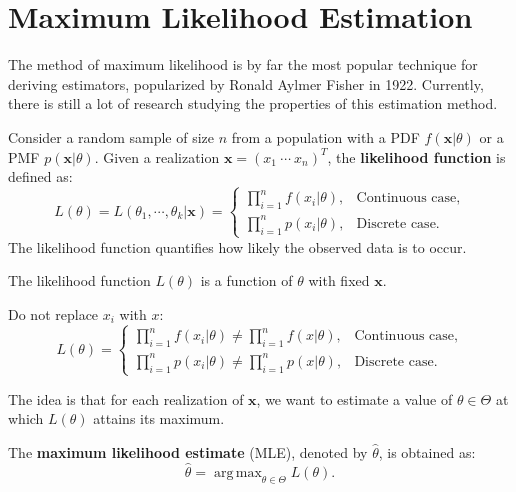 \documentclass{huhtakm-template-book-v2}
\DeclareMathOperator*{\argmax}{arg\,max}
\begin{document}
\section{Maximum Likelihood Estimation}
    The method of maximum likelihood is by far the most popular technique for deriving estimators, popularized by Ronald Aylmer Fisher in 1922. Currently, there is still a lot of research studying the properties of this estimation method.
    \begin{defn}
        Consider a random sample of size $n$ from a population with a PDF $f(\mathbf{x} | \theta)$ or a PMF $p(\mathbf{x} | \theta)$. Given a realization $\mathbf{x} = (x_{1}\ \cdots\ x_{n})^{T}$, the \textbf{likelihood function} is defined as:
        \begin{equation*}
            L(\theta) = L(\theta_{1}, \cdots, \theta_{k} | \mathbf{x}) = \begin{cases}
                \prod_{i=1}^{n} f(x_{i} | \theta), &\text{Continuous case},\\
                \prod_{i=1}^{n} p(x_{i} | \theta), &\text{Discrete case}.
            \end{cases}
        \end{equation*}
        The likelihood function quantifies how likely the observed data is to occur.
    \end{defn}
    \begin{rem}
        The likelihood function $L(\theta)$ is a function of $\theta$ with fixed $\mathbf{x}$.
    \end{rem}
    \begin{rem}
        Do not replace $x_{i}$ with $x$:
        \begin{equation*}
            L(\theta) = \begin{cases}
                \prod_{i=1}^{n} f(x_{i} | \theta) \neq \prod_{i=1}^{n} f(x | \theta), &\text{Continuous case},\\
                \prod_{i=1}^{n} p(x_{i} | \theta) \neq \prod_{i=1}^{n} p(x | \theta), &\text{Discrete case}.
            \end{cases}
        \end{equation*}
    \end{rem}
    The idea is that for each realization of $\mathbf{x}$, we want to estimate a value of $\theta \in \Theta$ at which $L(\theta)$ attains its maximum.
    \begin{defn}
        The \textbf{maximum likelihood estimate} (MLE), denoted by $\hat{\theta}$, is obtained as:
        \begin{equation*}
            \hat{\theta} = \argmax_{\theta \in \Theta} L(\theta).
        \end{equation*}
    \end{defn}
\end{document}
